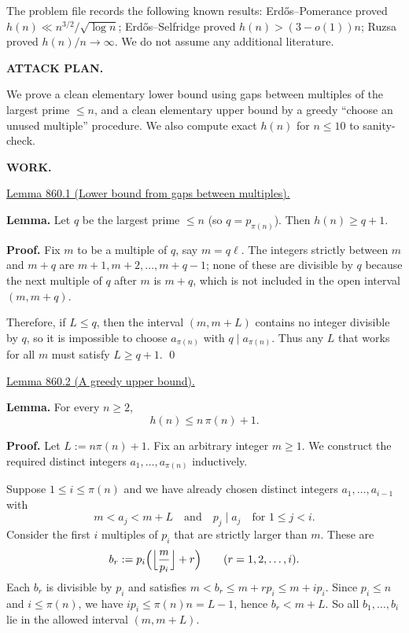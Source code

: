 The problem file records the following known results: Erd\H{o}s--Pomerance proved $h(n)\ll n^{3/2}/\sqrt{\log n}$; Erd\H{o}s--Selfridge proved $h(n)>(3-o(1))n$; Ruzsa proved $h(n)/n\to\infty$. We do not assume any additional literature.

\medskip
\noindent\textbf{ATTACK PLAN.}

We prove a clean elementary lower bound using gaps between multiples of the largest prime $\le n$, and a clean elementary upper bound by a greedy ``choose an unused multiple'' procedure.
We also compute exact $h(n)$ for $n\le 10$ to sanity-check.

\medskip
\noindent\textbf{WORK.}

\medskip
\noindent\underline{Lemma 860.1 (Lower bound from gaps between multiples).}

\textbf{Lemma.}
Let $q$ be the largest prime $\le n$ (so $q=p_{\pi(n)}$). Then $h(n)\ge q+1$.

\textbf{Proof.}
Fix $m$ to be a multiple of $q$, say $m=q\ell$.
The integers strictly between $m$ and $m+q$ are $m+1,m+2,\dots,m+q-1$; none of these are divisible by $q$ because the next multiple of $q$ after $m$ is $m+q$, which is not included in the open interval $(m,m+q)$.

Therefore, if $L\le q$, then the interval $(m,m+L)$ contains no integer divisible by $q$, so it is impossible to choose $a_{\pi(n)}$ with $q\mid a_{\pi(n)}$.
Thus any $L$ that works for all $m$ must satisfy $L\ge q+1$.
\qed

\medskip
\noindent\underline{Lemma 860.2 (A greedy upper bound).}

\textbf{Lemma.}
For every $n\ge 2$,
\[
 h(n) \le n\,\pi(n) + 1.
\]

\textbf{Proof.}
Let $L:=n\pi(n)+1$. Fix an arbitrary integer $m\ge 1$.
We construct the required distinct integers $a_1,\dots,a_{\pi(n)}$ inductively.

Suppose $1\le i\le \pi(n)$ and we have already chosen distinct integers $a_1,\dots,a_{i-1}$ with
\[
 m<a_j<m+L\quad\text{and}\quad p_j\mid a_j\quad\text{for }1\le j<i.
\]
Consider the first $i$ multiples of $p_i$ that are strictly larger than $m$.
These are
\[
 b_r := p_i\Bigl(\Bigl\lfloor \frac{m}{p_i}\Bigr\rfloor + r\Bigr)\qquad (r=1,2,\dots,i).
\]
Each $b_r$ is divisible by $p_i$ and satisfies $m < b_r \le m + r p_i \le m + i p_i$.
Since $p_i\le n$ and $i\le \pi(n)$, we have $i p_i \le \pi(n) n = L-1$, hence $b_r < m+L$.
So all $b_1,\dots,b_i$ lie in the allowed interval $(m,m+L)$.

